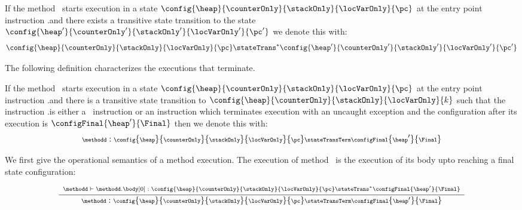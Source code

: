  \begin{transClosStateTrans0}\label{stateTransit}
 If  the method \methodd \  starts execution in a state $\config{ \heap}{\counterOnly}{\stackOnly}{\locVarOnly}{\pc}$ 
 at the entry point instruction \methodd.\body[0]
 and there exists  a transitive state transition  to the state $\config{ \heap'}{\counterOnly'}{\stackOnly'}{\locVarOnly'}{\pc'}$ we denote this with:
$$\config{ \heap}{\counterOnly}{\stackOnly}{\locVarOnly}{\pc} \stateTrans^{*} \config{ \heap'}{\counterOnly'}{\stackOnly'}{\locVarOnly'}{\pc'}  $$ 
\end{transClosStateTrans0}


The following definition characterizes the executions that terminate. 


 \begin{transClosStateTrans1} \label{stateTransClos}
   If  the method \methodd \  starts execution in a state $\config{ \heap}{\counterOnly}{\stackOnly}{\locVarOnly}{\pc}$   
   at the entry point instruction \methodd.\body[0] 
   and there is a transitive state transition to  $\config{ \heap}{\counterOnly}{\stackOnly}{\locVarOnly}{k}$ 
    such that the instruction \methodd.\body[k] is either a \return \ instruction or an 
    instruction which terminates execution with an uncaught exception and the configuration after its execution is 
    $\configFinal{ \heap'}{\Final}$ then   we denote this  with: 
    $$ {\scriptsize \methodd : \config{ \heap}{\counterOnly}{\stackOnly}{\locVarOnly}{ \pc } \stateTransTerm \configFinal{ \heap'}{\Final} }$$
 \end{transClosStateTrans1}
 



 We first give the operational semantics of a method execution. The execution of method \methodd \
 is the execution of its body upto reaching a final state configuration:
 
 $$
 {\scriptsize  \frac{\begin{array}{l}
          \methodd \vdash  \methodd.\body[0] :  
	                    \config{\heap}{\counterOnly}{\stackOnly}{\locVarOnly}{\pc}  \stateTrans^{*} \configFinal{\heap'}{\Final}\\
	\end{array}	 
       }
       {\methodd :  \config{\heap}{\counterOnly}{\stackOnly}{\locVarOnly}{\pc} 
		    \stateTransTerm
                   \configFinal{\heap'} {\Final} }}$$ \\


